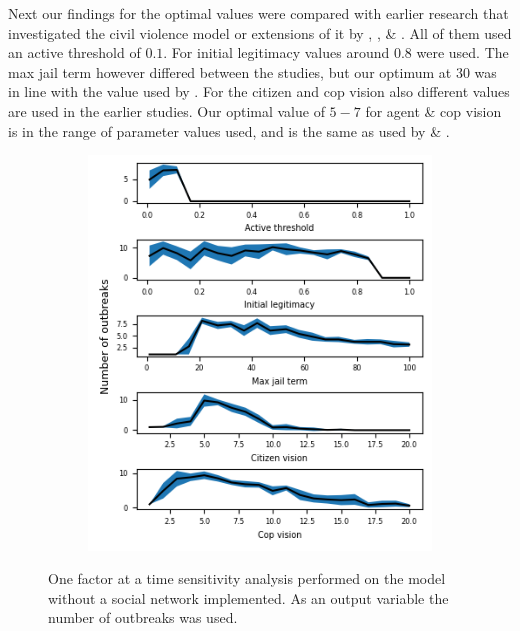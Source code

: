 \documentclass[10pt]{article}
\begin{document}
    Next our findings for the optimal values were compared with earlier research that investigated the civil violence model or extensions of it by \cite{epstein2002}, \cite{fonoberova2019}, \cite{huang2018} \& \cite{lemos2015}. All of them used an active threshold of $0.1$. For initial legitimacy values around $0.8$ were used. The max jail term however differed between the studies, but our optimum at $30$ was in line with the value used by \cite{lemos2015}. For the citizen and cop vision also different values are used in the earlier studies. Our optimal value of $5-7$ for agent \& cop vision is in the range of parameter values used, and is the same as used by \cite{lemos2015} \& \cite{epstein2002}.

    \begin{figure}[h]
        \centering
        \begin{subfigure}[b]{.45\linewidth}
            \includegraphics[width=\textwidth]{pictures/Sensitivity_analysis/Local SA2.png}
        \end{subfigure}
        \captionsetup{width=.5\linewidth}
        \caption{One factor at a time sensitivity analysis performed on the model without a social network implemented. As an output variable the number of outbreaks was used.}
        \label{fig:SA}
    \end{figure}
\end{document}

